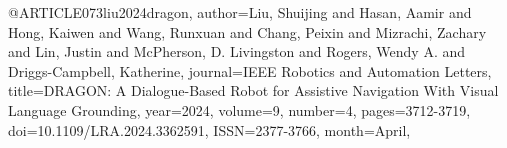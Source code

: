 @ARTICLE{073liu2024dragon,
author={Liu, Shuijing and Hasan, Aamir and Hong, Kaiwen and Wang, Runxuan and Chang, Peixin and Mizrachi, Zachary and Lin, Justin and McPherson, D. Livingston and Rogers, Wendy A. and Driggs-Campbell, Katherine},
journal={IEEE Robotics and Automation Letters}, 
title={DRAGON: A Dialogue-Based Robot for Assistive Navigation With Visual Language Grounding}, 
year={2024},
volume={9},
number={4},
pages={3712-3719},
doi={10.1109/LRA.2024.3362591},
ISSN={2377-3766},
month={April},}